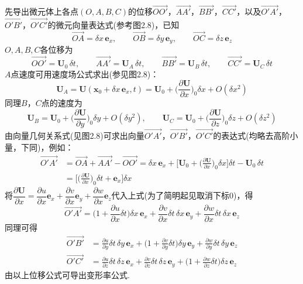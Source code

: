 先导出微元体上各点$(O,A,B,C)$的位移$\overrightarrow{OO'}$，$\overrightarrow{AA'}$，$\overrightarrow{BB'}$，$\overrightarrow{CC'}$，以及$\overrightarrow{O'A'}$，$\overrightarrow{O'B'}$，$\overrightarrow{O'C'}$的微元向量表达式(参考图2.8)，已知
\begin{equation*}
\overrightarrow{OA}=\delta x\,\boldsymbol{e}_x,\qquad \overrightarrow{OB}=\delta y\,\boldsymbol{e}_y,\qquad \overrightarrow{OC}=\delta z\,\boldsymbol{e}_z
\tag{2.24}
\end{equation*}
$O,A,B,C$各位移为
\begin{equation*}
\overrightarrow{OO'}=\boldsymbol{U}_0\,\delta t,\qquad \overrightarrow{AA'}=\boldsymbol{U}_A\,\delta t,\qquad \overrightarrow{BB'}=\boldsymbol{U}_B\,\delta t,\qquad \overrightarrow{CC'}=\boldsymbol{U}_C\,\delta t
\tag{2.25}
\end{equation*}
$A$点速度可用速度场公式求出(参见图2.8)：
\[
\boldsymbol{U}_A=\boldsymbol{U}(\boldsymbol{x}_0+\delta x\,\boldsymbol{e}_x,t)=\boldsymbol{U}_0+\Big(\frac{\partial\boldsymbol{U}}{\partial x}\Big)_{\!0}\delta x+O(\delta x^{2})
\]
同理$B$，$C$点的速度为
\[
\boldsymbol{U}_B=\boldsymbol{U}_0+\Big(\frac{\partial\boldsymbol{U}}{\partial y}\Big)_{\!0}\delta y+O(\delta y^{2}),\qquad \boldsymbol{U}_C=\boldsymbol{U}_0+\Big(\frac{\partial\boldsymbol{U}}{\partial z}\Big)_{\!0}\delta z+O(\delta z^{2})
\]
由向量几何关系式(见图2.8)可求出向量$\overrightarrow{O'A'}$，$\overrightarrow{O'B'}$，$\overrightarrow{O'C'}$的表达式(均略去高阶小量，下同)，例如：
\begin{align*}
\overrightarrow{O'A'}&=\overrightarrow{OA}+\overrightarrow{AA'}-\overrightarrow{OO'}=\delta x\,\boldsymbol{e}_x+\Big[\boldsymbol{U}_0+\Big(\frac{\partial\boldsymbol{U}}{\partial x}\Big)_{\!0}\delta x\Big]\delta t-\boldsymbol{U}_0\,\delta t\\
&=\Big[\Big(\frac{\partial\boldsymbol{U}}{\partial x}\Big)_{\!0}\delta t+\boldsymbol{e}_x\Big]\delta x
\end{align*}
将$\dfrac{\partial\boldsymbol{U}}{\partial x}=\dfrac{\partial u}{\partial x}\boldsymbol{e}_x+\dfrac{\partial v}{\partial x}\boldsymbol{e}_y+\dfrac{\partial w}{\partial x}\boldsymbol{e}_z$代入上式(为了简明起见取消下标0)，得
\[
\overrightarrow{O'A'}=\Big(1+\frac{\partial u}{\partial x}\delta t\Big)\delta x\,\boldsymbol{e}_x+\frac{\partial v}{\partial x}\delta t\,\delta x\,\boldsymbol{e}_y+\frac{\partial w}{\partial x}\delta t\,\delta x\,\boldsymbol{e}_z
\]
同理可得
\begin{align*}
\overrightarrow{O'B'}&=\frac{\partial u}{\partial y}\delta t\,\delta y\,\boldsymbol{e}_x+\Big(1+\frac{\partial v}{\partial y}\delta t\Big)\delta y\,\boldsymbol{e}_y+\frac{\partial w}{\partial y}\delta t\,\delta y\,\boldsymbol{e}_z\\
\overrightarrow{O'C'}&=\frac{\partial u}{\partial z}\delta t\,\delta z\,\boldsymbol{e}_x+\frac{\partial v}{\partial z}\delta t\,\delta z\,\boldsymbol{e}_y+\Big(1+\frac{\partial w}{\partial z}\delta t\Big)\delta z\,\boldsymbol{e}_z
\end{align*}
由以上位移公式可导出变形率公式.

